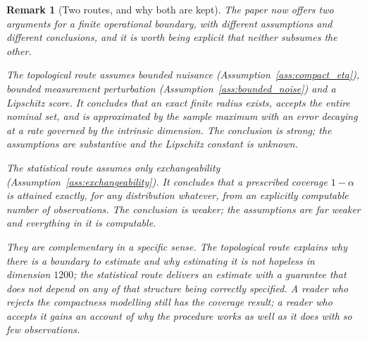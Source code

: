 \documentclass[a4paper]{cas-sc}
\newtheorem{remark}{Remark}
\begin{document}
\begin{remark}[Two routes, and why both are kept]
\label{rem:topology_vs_statistics}
The paper now offers two arguments for a finite operational boundary, with
different assumptions and different conclusions, and it is worth being
explicit that neither subsumes the other.

The topological route assumes bounded nuisance
(Assumption~\ref{ass:compact_eta}), bounded measurement perturbation
(Assumption~\ref{ass:bounded_noise}) and a Lipschitz score. It concludes that
an exact finite radius exists, accepts the entire nominal set, and is
approximated by the sample maximum with an error decaying at a rate governed
by the intrinsic dimension. The conclusion is strong; the assumptions are
substantive and the Lipschitz constant is unknown.

The statistical route assumes only exchangeability
(Assumption~\ref{ass:exchangeability}). It concludes that a prescribed
coverage \(1-\alpha\) is attained exactly, for any distribution whatever, from
an explicitly computable number of observations. The conclusion is weaker; the
assumptions are far weaker and everything in it is computable.

They are complementary in a specific sense. The topological route explains
\emph{why} there is a boundary to estimate and why estimating it is not
hopeless in dimension \(1200\); the statistical route delivers an estimate
with a guarantee that does not depend on any of that structure being correctly
specified. A reader who rejects the compactness modelling still has the
coverage result; a reader who accepts it gains an account of why the procedure
works as well as it does with so few observations.
\end{remark}
\end{document}
